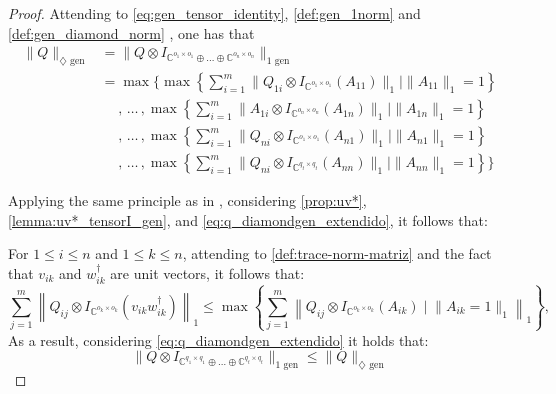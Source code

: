 \begin{proof}
  Attending to \autoref{eq:gen_tensor_identity}, \autoref{def:gen_1norm} and \autoref{def:gen_diamond_norm} , one has that
  \begin{equation} \label{eq:q_diamondgen_extendido}
    \begin{split}
      \lVert Q \rVert_{\diamondsuit \text{ gen}}  & = \lVert Q \otimes I_{\mathbb{C}^{o_1 \times o_1} \oplus \ldots \oplus \mathbb{C}^{o_n \times o_n}} \rVert_{1 \text{ gen}} \\
      & =  \max  \Bigg\{ \max \left\{ \sum_{i=1}^{m} \|Q_{1i} \otimes I_{\mathbb{C}^{o_1 \times o_1}} (A_{11})\|_{1}    \mid  \|A_{11}\|_{1} = 1 \right\} \\
      & \hspace{15pt}, \hspace{2pt} \ldots \hspace{2pt}, \max \left\{ \sum_{i=1}^{m} \|A_{1i} \otimes I_{\mathbb{C}^{o_n \times o_n}} (A_{1n})\|_{1}    \mid  \|A_{1n}\|_{1} = 1 \right\} \\ 
      & \hspace{15pt}, \hspace{2pt} \ldots \hspace{2pt}, \max \left\{ \sum_{i=1}^{m} \|Q_{ni} \otimes I_{\mathbb{C}^{o_1 \times o_1}} (A_{n1})\|_{1}    \mid  \|A_{n1}\|_{1} = 1 \right\} \\
    & \hspace{15pt}, \hspace{2pt} \ldots \hspace{2pt}, \max \left\{ \sum_{i=1}^{m} \|Q_{ni} \otimes I_{\mathbb{C}^{q_t \times q_t}} (A_{nn})\|_{1}   \mid  \|A_{nn}\|_{1} = 1 \right\} \Bigg\} 
    \end{split}
  \end{equation}


  Applying the same principle as in \cite[Proof of Theorem 3.36]{watrous2018theory}, considering \autoref{prop:uv*}, \autoref{lemma:uv*_tensorI_gen}, and \autoref{eq:q_diamondgen_extendido}, it follows that:


 For $ 1 \leq i \leq n$ and $ 1 \leq k \leq n$, attending to \autoref{def:trace-norm-matriz} and the fact that $v_{ik}$ and  $w_{ik}^\dag$ are unit vectors, it follows that:
  \begin{equation}
    \sum_{j=1}^{m} \left\lVert Q_{ij} \otimes I_{\mathbb{C}^{o_k \times o_k}} (v_{ik} w_{ik}^\dag)\right\rVert_{1} \leq \max \left\{ \sum_{j=1}^{m} \left\lVert Q_{ij} \otimes I_{\mathbb{C}^{o_k \times o_k}} (A_{ik}) \mid \lVert A_{ik}=1  \rVert_1 \right\rVert_{1}\right\},
  \end{equation}
   As a result, considering \autoref{eq:q_diamondgen_extendido} it holds that:
  \begin{equation}
    \lVert Q \otimes I_{\mathbb{C}^{q_1 \times q_1} \oplus \ldots \oplus \mathbb{C}^{q_t \times q_t}} \rVert_{1 \text{ gen}} \leq  \lVert Q \rVert_{\diamondsuit \text{ gen}}
  \end{equation}


\end{proof}
